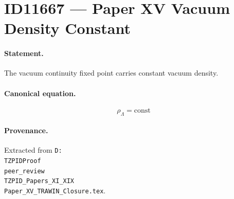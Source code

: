 \section*{ID11667 --- Paper XV Vacuum Density Constant}

\paragraph{Statement.}
The vacuum continuity fixed point carries constant vacuum density.

\paragraph{Canonical equation.}
\[
\rho_\Lambda=\mathrm{const}
\]

\paragraph{Provenance.}
Extracted from \texttt{D:\\TZPIDProof\\peer\_review\\TZPID\_Papers\_XI\_XIX\\Paper\_XV\_TRAWIN\_Closure.tex}.
